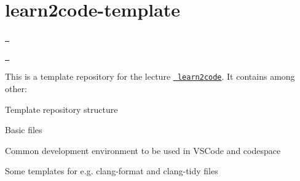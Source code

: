 \chapter{learn2code-\/template}
\hypertarget{md_README}{}\label{md_README}
\label{md_README_autotoc_md0}%
%


\href{https://github.com/codespaces/new?hide_repo_select=true&ref=main&repo=559622217&machine=basicLinux32gb&location=WestEurope}{\texttt{ }}

\href{https://gitpod.io/\#git@github.com:BenniWi/learn2code-template.git}{\texttt{  }}

This is a template repository for the lecture \href{https://github.com/BenniWi/learn2code}{\texttt{ learn2code}}. It contains among other\+:
\begin{DoxyEnumerate}
\item Template repository structure
\item Basic files
\item Common development environment to be used in VSCode and codespace
\item Some templates for e.\+g. clang-\/format and clang-\/tidy files 
\end{DoxyEnumerate}